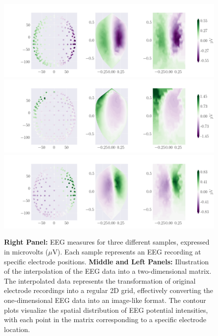 \documentclass[a4paper, UKenglish, 11pt]{uiomaster}
\begin{document}
\begin{figure}[!htb]
\centering
\includegraphics[width=\linewidth]{figures/purple_green/one_dipole_eeg_dipole_pos_0.png}
\includegraphics[width=\linewidth]{figures/purple_green/one_dipole_eeg_dipole_pos_1.png}
\includegraphics[width=\linewidth]{figures/purple_green/one_dipole_eeg_dipole_pos_3.png}

\caption{\newline
\textbf{Right Panel:} EEG measures for three different samples, expressed in microvolts ($\mu$V). Each sample represents an EEG recording at specific electrode positions. \newline
\textbf{Middle and Left Panels:} Illustration of the interpolation of the EEG data into a two-dimensional matrix. The interpolated data represents the transformation of original electrode recordings into a regular 2D grid, effectively converting the one-dimensional EEG data into an image-like format. The contour plots visualize the spatial distribution of EEG potential intensities, with each point in the matrix corresponding to a specific electrode location.}
\label{fig:eeg_dipole_pos_0}

\end{figure}
\end{document}
